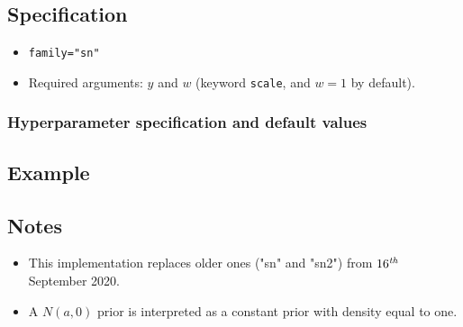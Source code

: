 \documentclass[a4paper,11pt]{article}
\begin{document}
\subsection*{Specification}

\begin{itemize}
\item \texttt{family="sn"}
\item Required arguments: $y$ and $w$ (keyword \texttt{scale}, and 
    $w=1$ by default).
\end{itemize}

\subsubsection*{Hyperparameter specification and default values}



\subsection*{Example}



\subsection*{Notes}

\begin{itemize}
\item This implementation replaces older ones ("sn" and "sn2") from
    $16^{\text{\emph{th}}}$ September 2020.
\item A $N(a,0)$ prior is interpreted as a constant prior with density
    equal to one.
\end{itemize}
\end{document}
